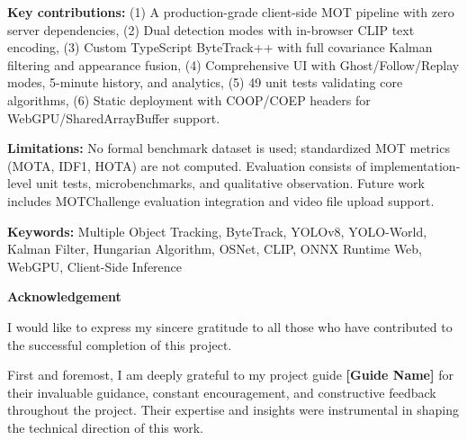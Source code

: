 \vspace{0.5cm}

\noindent \textbf{Key contributions:} (1) A production-grade client-side MOT pipeline with zero server dependencies, (2) Dual detection modes with in-browser CLIP text encoding, (3) Custom TypeScript ByteTrack++ with full covariance Kalman filtering and appearance fusion, (4) Comprehensive UI with Ghost/Follow/Replay modes, 5-minute history, and analytics, (5) 49 unit tests validating core algorithms, (6) Static deployment with COOP/COEP headers for WebGPU/SharedArrayBuffer support.

\vspace{0.5cm}

\noindent \textbf{Limitations:} No formal benchmark dataset is used; standardized MOT metrics (MOTA, IDF1, HOTA) are not computed. Evaluation consists of implementation-level unit tests, microbenchmarks, and qualitative observation. Future work includes MOTChallenge evaluation integration and video file upload support.

\vspace{1cm}

\noindent \textbf{Keywords:} Multiple Object Tracking, ByteTrack, YOLOv8, YOLO-World, Kalman Filter, Hungarian Algorithm, OSNet, CLIP, ONNX Runtime Web, WebGPU, Client-Side Inference

\newpage

\thispagestyle{plain}
\begin{center}
    {\Large \bfseries \color{trackvisiondark} Acknowledgement}\\[1cm]
\end{center}

\vspace{2cm}

\noindent I would like to express my sincere gratitude to all those who have contributed to the successful completion of this project.

\vspace{1cm}

\noindent First and foremost, I am deeply grateful to my project guide \textbf{[Guide Name]} for their invaluable guidance, constant encouragement, and constructive feedback throughout the project. Their expertise and insights were instrumental in shaping the technical direction of this work.

\vspace{1cm}

